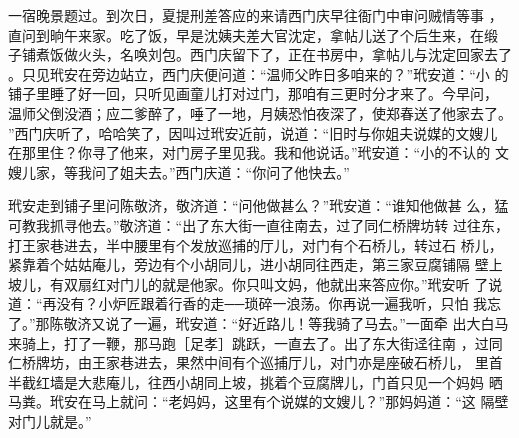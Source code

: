 一宿晚景题过。到次日，夏提刑差答应的来请西门庆早往衙门中审问贼情等事
，直问到晌午来家。吃了饭，早是沈姨夫差大官沈定，拿帖儿送了个后生来，在缎
子铺煮饭做火头，名唤刘包。西门庆留下了，正在书房中，拿帖儿与沈定回家去了
。只见玳安在旁边站立，西门庆便问道：“温师父昨日多咱来的？”玳安道：“小
的铺子里睡了好一回，只听见画童儿打对过门，那咱有三更时分才来了。今早问，
温师父倒没酒；应二爹醉了，唾了一地，月姨恐怕夜深了，使郑春送了他家去了。
”西门庆听了，哈哈笑了，因叫过玳安近前，说道：“旧时与你姐夫说媒的文嫂儿
在那里住？你寻了他来，对门房子里见我。我和他说话。”玳安道：“小的不认的
文嫂儿家，等我问了姐夫去。”西门庆道：“你问了他快去。”

玳安走到铺子里问陈敬济，敬济道：“问他做甚么？”玳安道：“谁知他做甚
么，猛可教我抓寻他去。”敬济道：“出了东大街一直往南去，过了同仁桥牌坊转
过往东，打王家巷进去，半中腰里有个发放巡捕的厅儿，对门有个石桥儿，转过石
桥儿，紧靠着个姑姑庵儿，旁边有个小胡同儿，进小胡同往西走，第三家豆腐铺隔
壁上坡儿，有双扇红对门儿的就是他家。你只叫文妈，他就出来答应你。”玳安听
了说道：“再没有？小炉匠跟着行香的走──琐碎一浪荡。你再说一遍我听，只怕
我忘了。”那陈敬济又说了一遍，玳安道：“好近路儿！等我骑了马去。”一面牵
出大白马来骑上，打了一鞭，那马跑［足孝］跳跃，一直去了。出了东大街迳往南
，过同仁桥牌坊，由王家巷进去，果然中间有个巡捕厅儿，对门亦是座破石桥儿，
里首半截红墙是大悲庵儿，往西小胡同上坡，挑着个豆腐牌儿，门首只见一个妈妈
晒马粪。玳安在马上就问：“老妈妈，这里有个说媒的文嫂儿？”那妈妈道：“这
隔壁对门儿就是。”

